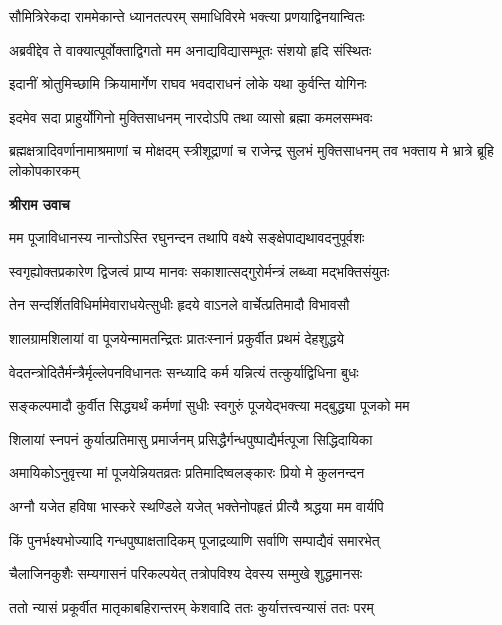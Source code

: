 \twolineshloka
{सौमित्रिरेकदा राममेकान्ते ध्यानतत्परम्}
{समाधिविरमे भक्त्या प्रणयाद्विनयान्वितः} %

\twolineshloka
{अब्रवीद्देव ते वाक्यात्पूर्वोक्ताद्विगतो मम}
{अनाद्यविद्यासम्भूतः संशयो हृदि संस्थितः} %

\twolineshloka
{इदानीं श्रोतुमिच्छामि क्रियामार्गेण राघव}
{भवदाराधनं लोके यथा कुर्वन्ति योगिनः} %

\twolineshloka
{इदमेव सदा प्राहुर्योगिनो मुक्तिसाधनम्}
{नारदोऽपि तथा व्यासो ब्रह्मा कमलसम्भवः} %

\threelineshloka
{ब्रह्मक्षत्रादिवर्णानामाश्रमाणां च मोक्षदम्}
{स्त्रीशूद्राणां च राजेन्द्र सुलभं मुक्तिसाधनम्}
{तव भक्ताय मे भ्रात्रे ब्रूहि लोकोपकारकम्} %

\textbf{श्रीराम उवाच}

\twolineshloka
{मम पूजाविधानस्य नान्तोऽस्ति रघुनन्दन}
{तथापि वक्ष्ये सङ्क्षेपाद्यथावदनुपूर्वशः} %

\twolineshloka
{स्वगृह्योक्तप्रकारेण द्विजत्वं प्राप्य मानवः}
{सकाशात्सद्गुरोर्मन्त्रं लब्ध्वा मद्भक्तिसंयुतः} %

\twolineshloka
{तेन सन्दर्शितविधिर्मामेवाराधयेत्सुधीः}
{हृदये वाऽनले वार्चेत्प्रतिमादौ विभावसौ} %

\twolineshloka
{शालग्रामशिलायां वा पूजयेन्मामतन्द्रितः}
{प्रातःस्नानं प्रकुर्वीत प्रथमं देहशुद्धये} %

\twolineshloka
{वेदतन्त्रोदितैर्मन्त्रैर्मृल्लेपनविधानतः}
{सन्ध्यादि कर्म यन्नित्यं तत्कुर्याद्विधिना बुधः} %

\twolineshloka
{सङ्कल्पमादौ कुर्वीत सिद्ध्यर्थं कर्मणां सुधीः}
{स्वगुरुं पूजयेद्भक्त्या मद्बुद्ध्या पूजको मम} %

\twolineshloka
{शिलायां स्नपनं कुर्यात्प्रतिमासु प्रमार्जनम्}
{प्रसिद्धैर्गन्धपुष्पाद्यैर्मत्पूजा सिद्धिदायिका} %

\twolineshloka
{अमायिकोऽनुवृत्त्या मां पूजयेन्नियतव्रतः}
{प्रतिमादिष्वलङ्कारः प्रियो मे कुलनन्दन} %

\twolineshloka
{अग्नौ यजेत हविषा भास्करे स्थण्डिले यजेत्}
{भक्तेनोपहृतं प्रीत्यै श्रद्धया मम वार्यपि} %

\twolineshloka
{किं पुनर्भक्ष्यभोज्यादि गन्धपुष्पाक्षतादिकम्}
{पूजाद्रव्याणि सर्वाणि सम्पाद्यैवं समारभेत्} %

\twolineshloka
{चैलाजिनकुशैः सम्यगासनं परिकल्पयेत्}
{तत्रोपविश्य देवस्य सम्मुखे शुद्धमानसः} %

\twolineshloka
{ततो न्यासं प्रकूर्वीत मातृकाबहिरान्तरम्}
{केशवादि ततः कुर्यात्तत्त्वन्यासं ततः परम्} %

